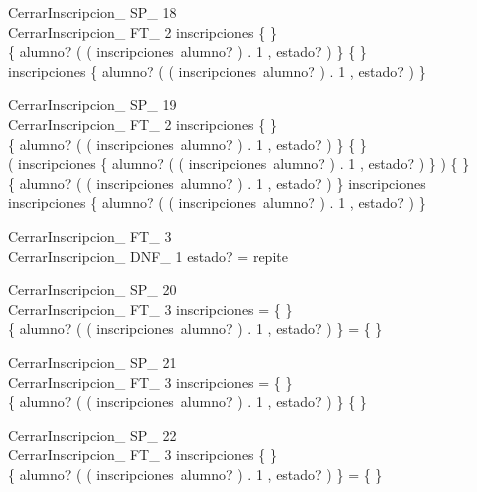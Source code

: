 \documentclass{article}
\begin{document}
 
 \begin{schema}{CerrarInscripcion\_ SP\_ 18}\\
  CerrarInscripcion\_ FT\_ 2 
 \where
  inscripciones \neq \{ \} \\
  \{ alumno? \mapsto ( ( inscripciones~alumno? ) . 1 , estado? ) \} \neq \{ \} \\
  \dom inscripciones \subset \dom \{ alumno? \mapsto ( ( inscripciones~alumno? ) . 1 , estado? ) \}
 \end{schema}
 
 
 \begin{schema}{CerrarInscripcion\_ SP\_ 19}\\
  CerrarInscripcion\_ FT\_ 2 
 \where
  inscripciones \neq \{ \} \\
  \{ alumno? \mapsto ( ( inscripciones~alumno? ) . 1 , estado? ) \} \neq \{ \} \\
  ( \dom inscripciones \cap \dom \{ alumno? \mapsto ( ( inscripciones~alumno? ) . 1 , estado? ) \} ) \neq \{ \} \\
  \lnot \dom \{ alumno? \mapsto ( ( inscripciones~alumno? ) . 1 , estado? ) \} \subseteq \dom inscripciones \\
  \lnot \dom inscripciones \subseteq \dom \{ alumno? \mapsto ( ( inscripciones~alumno? ) . 1 , estado? ) \}
 \end{schema}
 
 
 \begin{schema}{CerrarInscripcion\_ FT\_ 3}\\
  CerrarInscripcion\_ DNF\_ 1 
 \where
  estado? = repite
 \end{schema}
 
 
 \begin{schema}{CerrarInscripcion\_ SP\_ 20}\\
  CerrarInscripcion\_ FT\_ 3 
 \where
  inscripciones = \{ \} \\
  \{ alumno? \mapsto ( ( inscripciones~alumno? ) . 1 , estado? ) \} = \{ \}
 \end{schema}
 
 
 \begin{schema}{CerrarInscripcion\_ SP\_ 21}\\
  CerrarInscripcion\_ FT\_ 3 
 \where
  inscripciones = \{ \} \\
  \{ alumno? \mapsto ( ( inscripciones~alumno? ) . 1 , estado? ) \} \neq \{ \}
 \end{schema}
 
 
 \begin{schema}{CerrarInscripcion\_ SP\_ 22}\\
  CerrarInscripcion\_ FT\_ 3 
 \where
  inscripciones \neq \{ \} \\
  \{ alumno? \mapsto ( ( inscripciones~alumno? ) . 1 , estado? ) \} = \{ \}
 \end{schema}
 
\end{document}
